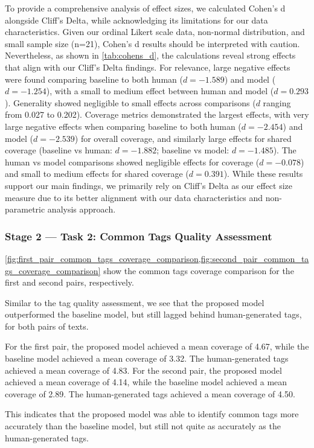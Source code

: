 To provide a comprehensive analysis of effect sizes, we calculated Cohen's d alongside Cliff's Delta, while acknowledging its limitations for our data characteristics. Given our ordinal Likert scale data, non-normal distribution, and small sample size (n=21), Cohen's d results should be interpreted with caution. Nevertheless, as shown in \cref{tab:cohens_d}, the calculations reveal strong effects that align with our Cliff's Delta findings. For relevance, large negative effects were found comparing baseline to both human ($d = -1.589$) and model ($d = -1.254$), with a small to medium effect between human and model ($d = 0.293$). Generality showed negligible to small effects across comparisons ($d$ ranging from 0.027 to 0.202). Coverage metrics demonstrated the largest effects, with very large negative effects when comparing baseline to both human ($d = -2.454$) and model ($d = -2.539$) for overall coverage, and similarly large effects for shared coverage (baseline vs human: $d = -1.882$; baseline vs model: $d = -1.485$). The human vs model comparisons showed negligible effects for coverage ($d = -0.078$) and small to medium effects for shared coverage ($d = 0.391$). While these results support our main findings, we primarily rely on Cliff's Delta as our effect size measure due to its better alignment with our data characteristics and non-parametric analysis approach.

\subsubsection{Stage 2 — Task 2: Common Tags Quality Assessment}
\cref{fig:first_pair_common_tags_coverage_comparison,fig:second_pair_common_tags_coverage_comparison} show the common tags coverage comparison for the first and second pairs, respectively.

Similar to the tag quality assessment, we see that the proposed model outperformed the baseline model, but still lagged behind human-generated tags, for both pairs of texts.

For the first pair, the proposed model achieved a mean coverage of 4.67, while the baseline model achieved a mean coverage of 3.32. The human-generated tags achieved a mean coverage of 4.83. For the second pair, the proposed model achieved a mean coverage of 4.14, while the baseline model achieved a mean coverage of 2.89. The human-generated tags achieved a mean coverage of 4.50.

This indicates that the proposed model was able to identify common tags more accurately than the baseline model, but still not quite as accurately as the human-generated tags.

